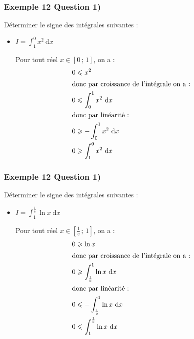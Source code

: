 \documentclass[11pt, hyperref={urlcolor=red,%
            linkcolor=blue, %
            colorlinks=true}]{beamer}
\newcommand{\Interff}[2]{\left[#1\, ;\, #2\right]}
\newcommand{\dx}{\ensuremath{\text{d}x}}		%
\newcommand{\integralex}[3]{\int_{#1}^{#2} #3 \ \dx}
\begin{document}
\begin{frame}
\frametitle{Exemple  12 Question 1)}



Déterminer le signe des intégrales suivantes :

\begin{itemize}
 \item $I=\integralex{1}{0}{x^{2}}$

Pour tout réel $x \in \Interff{0}{1}$, on a  :
\pause\begin{align*}
  0   & \leqslant x^{2} \\
 \intertext{donc par croissance de l'intégrale on a : }
 0 & \leqslant \integralex{0}{1}{x^{2}} \\ 
  \intertext{donc par linéarité : }
   0 & \geqslant -\integralex{0}{1}{x^{2}} \\ 
      0 & \geqslant \integralex{1}{0}{x^{2}} \\ 
\end{align*}


\end{itemize}



\end{frame}



\begin{frame}
\frametitle{Exemple  12 Question 1)}



Déterminer le signe des intégrales suivantes :

\begin{itemize}
\item $I=\integralex{1}{\frac{1}{\text{e}}}{\ln x}$

Pour tout réel $x \in \Interff{\frac{1}{\text{e}}}{1}$, on a  :
\pause \begin{align*}
  0   & \geqslant \ln x  \\
 \intertext{donc par croissance de l'intégrale on a : }
 0 & \geqslant \integralex{\frac{1}{\text{e}}}{1}{\ln x} \\ 
  \intertext{donc par linéarité : }
   0 & \leqslant -\integralex{\frac{1}{\text{e}}}{1}{\ln x}\\ 
      0 & \leqslant \integralex{1}{\frac{1}{\text{e}}}{\ln x} \\ 
\end{align*}


\end{itemize}



\end{frame}
\end{document}
